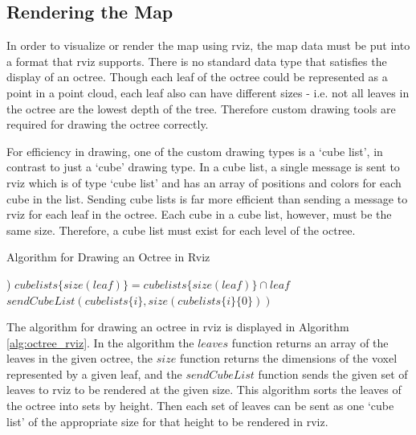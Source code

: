 \documentclass[12pt]{report}
\begin{document}
\subsection{Rendering the Map}
In order to visualize or render the map using rviz, the map data must be put into a format that rviz supports.  There is no standard data type that satisfies the display of an octree.  Though each leaf of the octree could be represented as a point in a point cloud, each leaf also can have different sizes - i.e. not all leaves in the octree are the lowest depth of the tree.  Therefore custom drawing tools are required for drawing the octree correctly.

For efficiency in drawing, one of the custom drawing types is a `cube list', in contrast to just a `cube' drawing type.  In a cube list, a single message is sent to rviz which is of type `cube list' and has an array of positions and colors for each cube in the list.  Sending cube lists is far more efficient than sending a message to rviz for each leaf in the octree.  Each cube in a cube list, however, must be the same size.  Therefore, a cube list must exist for each level of the octree.

\begin{algorithm}
\caption{Algorithm for Drawing an Octree in Rviz}
\label{alg:octree_rviz}
\begin{algorithmic}
  \STATE {}
  \STATE {})
    \STATE $cubelists\{size(leaf)\} = cubelists\{size(leaf)\} \cap leaf$
  \ENDFOR
    \STATE $sendCubeList(cubelists\{i\}, size(cubelists\{i\}\{0\}))$
  \ENDFOR
\end{algorithmic}
\end{algorithm}

The algorithm for drawing an octree in rviz is displayed in Algorithm \ref{alg:octree_rviz}.  In the algorithm the $leaves$ function returns an array of the leaves in the given octree, the $size$ function returns the dimensions of the voxel represented by a given leaf, and the $sendCubeList$ function sends the given set of leaves to rviz to be rendered at the given size.  This algorithm sorts the leaves of the octree into sets by height.  Then each set of leaves can be sent as one `cube list' of the appropriate size for that height to be rendered in rviz.
\end{document}

